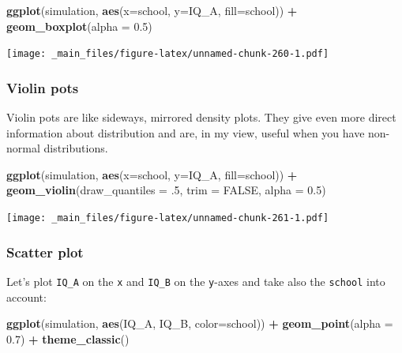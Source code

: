 \documentclass[
]{scrartcl}
\newenvironment{Shaded}{\begin{snugshade}}{\end{snugshade}}
\newcommand{\DataTypeTok}[1]{\textcolor[rgb]{0.13,0.29,0.53}{#1}}
\newcommand{\FloatTok}[1]{\textcolor[rgb]{0.00,0.00,0.81}{#1}}
\newcommand{\KeywordTok}[1]{\textcolor[rgb]{0.13,0.29,0.53}{\textbf{#1}}}
\newcommand{\NormalTok}[1]{#1}
\newcommand{\OperatorTok}[1]{\textcolor[rgb]{0.81,0.36,0.00}{\textbf{#1}}}
\newcommand{\OtherTok}[1]{\textcolor[rgb]{0.56,0.35,0.01}{#1}}
\newcommand{\StringTok}[1]{\textcolor[rgb]{0.31,0.60,0.02}{#1}}
\begin{document}
\begin{Shaded}
\begin{Highlighting}[]
\KeywordTok{ggplot}\NormalTok{(simulation, }\KeywordTok{aes}\NormalTok{(}\DataTypeTok{x=}\NormalTok{school, }\DataTypeTok{y=}\NormalTok{IQ\_A, }\DataTypeTok{fill=}\NormalTok{school)) }\OperatorTok{+}
\StringTok{  }\KeywordTok{geom\_boxplot}\NormalTok{(}\DataTypeTok{alpha =} \FloatTok{0.5}\NormalTok{)}
\end{Highlighting}
\end{Shaded}

\texttt{[image: \_main\_files/figure-latex/unnamed-chunk-260-1.pdf]}

\hypertarget{violin-pots}{%
\subsubsection{Violin pots}\label{violin-pots}}

Violin pots are like sideways, mirrored density plots. They give even more direct information about distribution and are, in my view, useful when you have non-normal distributions.

\begin{Shaded}
\begin{Highlighting}[]
\KeywordTok{ggplot}\NormalTok{(simulation, }\KeywordTok{aes}\NormalTok{(}\DataTypeTok{x=}\NormalTok{school, }\DataTypeTok{y=}\NormalTok{IQ\_A, }\DataTypeTok{fill=}\NormalTok{school)) }\OperatorTok{+}
\StringTok{    }\KeywordTok{geom\_violin}\NormalTok{(}\DataTypeTok{draw\_quantiles =} \FloatTok{.5}\NormalTok{, }\DataTypeTok{trim =} \OtherTok{FALSE}\NormalTok{, }\DataTypeTok{alpha =} \FloatTok{0.5}\NormalTok{)}
\end{Highlighting}
\end{Shaded}

\texttt{[image: \_main\_files/figure-latex/unnamed-chunk-261-1.pdf]}

\hypertarget{scatter-plot}{%
\subsubsection{Scatter plot}\label{scatter-plot}}

Let's plot \texttt{IQ\_A} on the \texttt{x} and \texttt{IQ\_B} on the \texttt{y}-axes and take also the \texttt{school} into account:

\begin{Shaded}
\begin{Highlighting}[]
\KeywordTok{ggplot}\NormalTok{(simulation, }\KeywordTok{aes}\NormalTok{(IQ\_A, IQ\_B, }\DataTypeTok{color=}\NormalTok{school)) }\OperatorTok{+}
\StringTok{  }\KeywordTok{geom\_point}\NormalTok{(}\DataTypeTok{alpha =} \FloatTok{0.7}\NormalTok{) }\OperatorTok{+}
\StringTok{  }\KeywordTok{theme\_classic}\NormalTok{()}
\end{Highlighting}
\end{Shaded}
\end{document}
